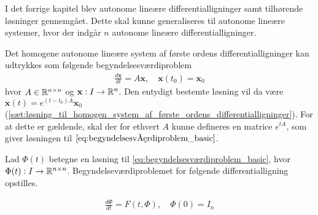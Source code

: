 I det forrige kapitel blev autonome lineære differentialligninger samt tilhørende løsninger gennemgået. Dette skal kunne generaliseres til autonome lineære systemer, hvor der indgår $n$ autonome lineære differentialligninger.  

Det homogene autonome lineære system af første ordens differentialligninger kan udtrykkes som følgende begyndelsesværdiproblem
%
\begin{align} \label{eq:begyndelsesværdiproblem_basic}
    \frac{d\textbf{x}}{dt}=A\textbf{x}, \quad \textbf{x}(t_0)=\textbf{x}_0
\end{align}
%
hvor $A \in \mathbb{R}^{n \times n}$ og $\textbf{x}: I \to \mathbb{R}^n$. Den entydigt bestemte løsning vil da være $\textbf{x}(t)=e^{(t-t_0)A}\textbf{x}_0$ (\autoref{sæt:løsning_til_homogen_system_af_første_ordens_differentialligninger}). For at dette er gældende, skal der for ethvert $A$ kunne defineres en matrice $e^{tA}$, som giver løsningen til $\eqref{eq:begyndelsesværdiproblem_basic}$.

Lad $\Phi(t)$ betegne en løsning til \eqref{eq:begyndelsesværdiproblem_basic}, hvor $\Phi(t): I\to \mathbb{R}^{n \times n}$. Begyndelseværdiproblemet for følgende differentialligning opstilles.

\begin{align*}
    \frac{d\Phi}{dt}= F(t,\Phi), \quad \Phi(0)=I_n
\end{align*}

